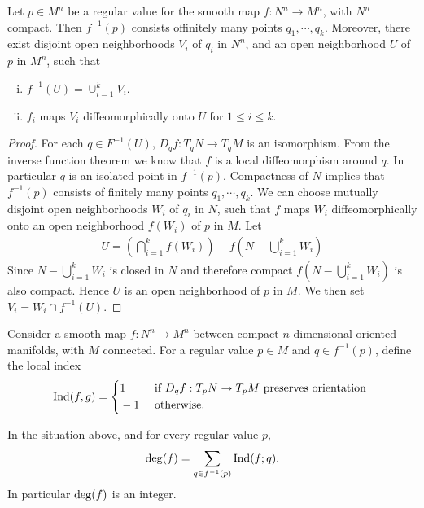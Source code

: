 \begin{lemma}\label{lemma:11-8}
  Let $p\in M^n$ be a regular value for the smooth map $f:N^n\to M^n$, with $N^n$ compact. 
  Then $f^{-1}(p)$ consists offinitely many points $q_1, \cdots, q_k$. Moreover, there exist 
  disjoint open neighborhoods $V_i$ of $q_i$ in $N^n$, and an open neighborhood $U$ of $p$ in $M^n$,
  such that
  \begin{enumerate}[(i)]
    \item $f^{-1}(U) = \cup_{i=1}^k V_i$.
    \item $f_i$ maps $V_i$ diffeomorphically onto $U$ for $1\le i\le k$.
  \end{enumerate}
\end{lemma}

\begin{proof}
  For each $q\in F^{-1}(U)$, $D_qf:T_qN\to T_q M$ is an isomorphism. From the
inverse function theorem we know that $f$ is a local diffeomorphism around $q$. In
particular $q$ is an isolated point in $f^{-1}(p)$. Compactness of $N$ implies that $f^{-1}(p)$
consists of finitely many points $q_1, \cdots, q_k$. We can choose mutually disjoint open
neighborhoods $W_i$ of $q_i$ in $N$, such that $f$ maps $W_i$ diffeomorphically onto an
open neighborhood $f(W_i)$ of $p$ in $M$. Let
\begin{align*}
  U = \left(\bigcap_{i=1}^k f(W_i)\right)
    - f\left(N - \bigcup_{i=1}^k W_i\right) 
\end{align*}
Since $N - \bigcup_{i=1}^k W_i$ is closed in $N$ and therefore compact $f(N - \bigcup_{i=1}^k W_i)$ is 
also compact. Hence $U$ is an open neighborhood of $p$ in $M$. We then set 
$V_i = W_i\cap f^{-1}(U)$.
\end{proof}

Consider a smooth map $f:N^n\to M^n$ between compact $n$-dimensional oriented
manifolds, with $M$ connected. For a regular value $p\in M$ and $q\in f^{-1}(p)$, define
the local index
\begin{align}
  \mathrm{Ind}(f, g) = \left\{\begin{aligned}
    & 1   && \text{ if } D_qf:T_pN \to T_pM \text{ preserves orientation } \\
    & -1  && \text{ otherwise. }
  \end{aligned}\right.
\end{align}

\begin{theorem}\label{theorem:11-9}
  In the situation above, and for every regular value $p$, 
  \begin{align*}
    \mathrm{deg}(f) = \sum_{q\in f^{-1}(p)}{\mathrm{Ind}(f; q)}.
  \end{align*}
  In particular $\mathrm{deg}(f)$ is an integer. 
\end{theorem}

